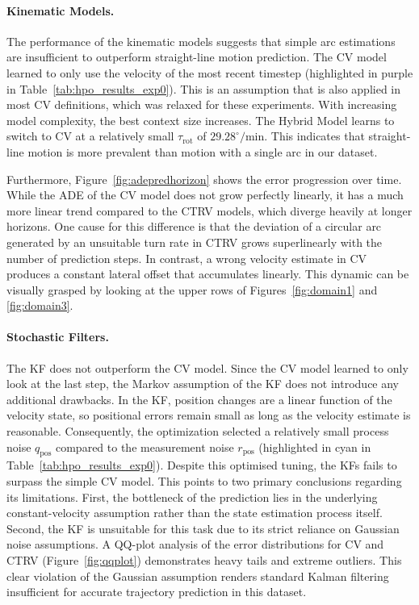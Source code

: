 \paragraph{Kinematic Models.}
The performance of the kinematic models suggests that simple arc estimations are insufficient to outperform straight-line motion prediction. The \ac{CV} model learned to only use the velocity of the most recent timestep (highlighted in purple in Table~\ref{tab:hpo_results_exp0}).
This is an assumption that is also applied in most \ac{CV} definitions, which was relaxed for these experiments. With increasing model complexity, the best context size increases. The Hybrid Model learns to switch to \ac{CV} at a relatively small $\tau_\text{rot}$ of $29.28^\circ/\text{min}$. This indicates that straight-line motion is more prevalent than motion with a single arc in our dataset. 

Furthermore, Figure~\ref{fig:adepredhorizon} shows the error progression over time. While the \ac{ADE} of the \ac{CV} model does not grow perfectly linearly, it has a much more linear trend compared to the \ac{CTRV} models, which diverge heavily at longer horizons.
One cause for this difference is that the deviation of a circular arc generated by an unsuitable turn rate in \ac{CTRV} grows superlinearly with the number of prediction steps. In contrast, a wrong velocity estimate in \ac{CV} produces a constant lateral offset that accumulates linearly. This dynamic can be visually grasped by looking at the upper rows of Figures~\ref{fig:domain1} and \ref{fig:domain3}.


\paragraph{Stochastic Filters.}

The \ac{KF} does not outperform the \ac{CV} model. Since the \ac{CV} model learned to only look at the last step, the Markov assumption of the \ac{KF} does not introduce any additional drawbacks. In the \ac{KF}, position changes are a linear function of the velocity state, so positional errors remain small as long as the velocity estimate is reasonable.
Consequently, the optimization selected a relatively small process noise $q_\text{pos}$ compared to the measurement noise $r_\text{pos}$ (highlighted in cyan in Table~\ref{tab:hpo_results_exp0}).
Despite this optimised tuning, the \acp{KF} fails to surpass the simple \ac{CV} model. This points to two primary conclusions regarding its limitations.
First, the bottleneck of the prediction lies in the underlying constant-velocity assumption rather than the state estimation process itself. Second, the \ac{KF} is unsuitable for this task due to its strict reliance on Gaussian noise assumptions.
A QQ-plot analysis of the error distributions for \ac{CV} and \ac{CTRV} (Figure~\ref{fig:qqplot}) demonstrates heavy tails and extreme outliers.
This clear violation of the Gaussian assumption renders standard Kalman filtering insufficient for accurate trajectory prediction in this dataset.

